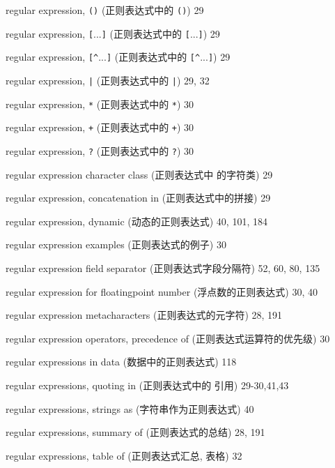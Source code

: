 \begin{multicols}{2}
\hangindent=2pc  regular expression, \verb'()' (正则表达式中的
\verb'()') 29

\hangindent=2pc  regular expression, \verb'['...\verb']'
(正则表达式中的 \verb'['...\verb']') 29

\hangindent=2pc  regular expression, \verb'[^'...\verb']'
(正则表达式中的 \verb'[^'...\verb']') 29

\hangindent=2pc  regular expression, \verb'|' (正则表达式中的
\verb'|') 29, 32

\hangindent=2pc  regular expression, \verb'*' (正则表达式中的
\verb'*') 30

\hangindent=2pc  regular expression, \verb'+' (正则表达式中的
\verb'+') 30

\hangindent=2pc  regular expression, \verb'?' (正则表达式中的
\verb'?') 30

\hangindent=2pc  regular expression character class (正则表达式中 
的字符类) 29

\hangindent=2pc  regular expression, concatenation in
(正则表达式中的拼接) 29

\hangindent=2pc  regular expression, dynamic (动态的正则表达式) 40, 101, 184

\hangindent=2pc  regular expression examples (正则表达式的例子) 30

\hangindent=2pc  regular expression field separator
(正则表达式字段分隔符) 52, 60, 80, 135

\hangindent=2pc  regular expression for floatingpoint number
(浮点数的正则表达式) 30, 40

\hangindent=2pc  regular expression metacharacters (正则表达式的元字符) 28, 191

\hangindent=2pc  regular expression operators, precedence of
(正则表达式运算符的优先级) 30

\hangindent=2pc  regular expressions in data
(数据中的正则表达式) 118

\hangindent=2pc  regular expressions, quoting in (正则表达式中的 
引用) 29-30,41,43

\hangindent=2pc  regular expressions, strings as
(字符串作为正则表达式) 40

\hangindent=2pc  regular expressions, summary of
(正则表达式的总结) 28, 191

\hangindent=2pc  regular expressions, table of (正则表达式汇总,
表格) 32


\end{multicols}
